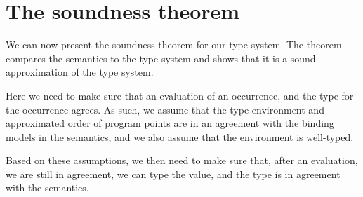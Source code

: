 \documentclass{llncs}
\newcommand{\sqleq}{\ensuremath{\sqsubseteq\xspace}}
\begin{document}




\section{The soundness theorem}

We can now present the soundness theorem for our type system. The
theorem compares the semantics to the type system and shows that it is
a sound approximation of the type system.

Here we need to make sure that an
evaluation of an occurrence, and the type for the occurrence agrees. 
As such, we assume that the type environment and approximated order of
program points are in an agreement with the binding models in the
semantics, and we also assume that the environment is well-typed. 

Based on these assumptions, we then need to make sure that, after an
evaluation, we are still in agreement, we can type the value, and the
type is in agreement with the semantics. 
\end{document}
